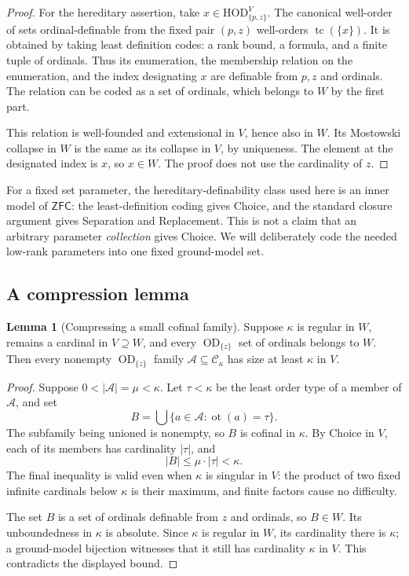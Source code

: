 \documentclass[11pt,letterpaper]{article}
\theoremstyle{definition}
\newtheorem{lemma}[definition]{Lemma}
\numberwithin{equation}{section}
\newcommand{\ZFC}{\mathsf{ZFC}}
\newcommand{\HOD}{\mathrm{HOD}}
\newcommand{\ODp}[1]{\operatorname{OD}_{\{#1\}}}
\newcommand{\Cof}{\mathcal C}
\begin{document}
\begin{proof}
For the hereditary assertion, take $x\in\HOD_{\{p,z\}}^V$. The canonical well-order of sets ordinal-definable from the fixed pair $(p,z)$ well-orders $\operatorname{tc}(\{x\})$. It is obtained by taking least definition codes: a rank bound, a formula, and a finite tuple of ordinals. Thus its enumeration, the membership relation on the enumeration, and the index designating $x$ are definable from $p,z$ and ordinals. The relation can be coded as a set of ordinals, which belongs to $W$ by the first part.

This relation is well-founded and extensional in $V$, hence also in $W$. Its Mostowski collapse in $W$ is the same as its collapse in $V$, by uniqueness. The element at the designated index is $x$, so $x\in W$. The proof does not use the cardinality of $z$.
\end{proof}

For a fixed set parameter, the hereditary-definability class used here is an inner model of $\ZFC$: the least-definition coding gives Choice, and the standard closure argument gives Separation and Replacement. This is not a claim that an arbitrary parameter \emph{collection} gives Choice. We will deliberately code the needed low-rank parameters into one fixed ground-model set.

\subsection{A compression lemma}

\begin{lemma}[Compressing a small cofinal family]\label{lem:compress}
Suppose $\kappa$ is regular in $W$, remains a cardinal in $V\supseteq W$, and every $\ODp{z}$ set of ordinals belongs to $W$. Then every nonempty $\ODp{z}$ family $\mathcal A\subseteq\Cof_\kappa$ has size at least $\kappa$ in $V$.
\end{lemma}
\begin{proof}
Suppose $0<|\mathcal A|=\mu<\kappa$. Let $\tau<\kappa$ be the least order type of a member of $\mathcal A$, and set
\[
 B=\bigcup\{a\in\mathcal A:\operatorname{ot}(a)=\tau\}.
\]
The subfamily being unioned is nonempty, so $B$ is cofinal in $\kappa$. By Choice in $V$, each of its members has cardinality $|\tau|$, and
\[
 |B|\le\mu\cdot|\tau|<\kappa.
\]
The final inequality is valid even when $\kappa$ is singular in $V$: the product of two fixed infinite cardinals below $\kappa$ is their maximum, and finite factors cause no difficulty.

The set $B$ is a set of ordinals definable from $z$ and ordinals, so $B\in W$. Its unboundedness in $\kappa$ is absolute. Since $\kappa$ is regular in $W$, its cardinality there is $\kappa$; a ground-model bijection witnesses that it still has cardinality $\kappa$ in $V$. This contradicts the displayed bound.
\end{proof}
\end{document}
